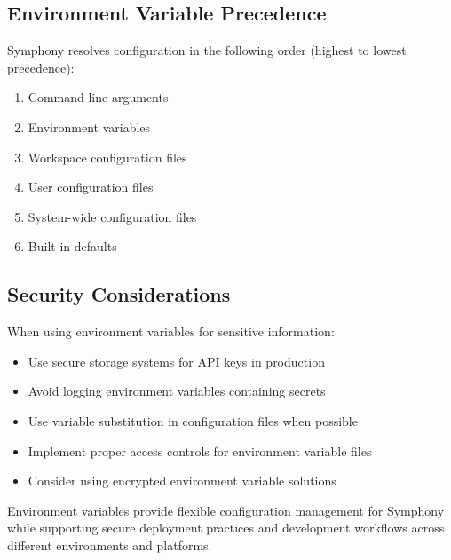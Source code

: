 \subsection*{Environment Variable Precedence}

Symphony resolves configuration in the following order (highest to lowest precedence):

\begin{enumerate}
\item Command-line arguments
\item Environment variables
\item Workspace configuration files
\item User configuration files
\item System-wide configuration files
\item Built-in defaults
\end{enumerate}

\subsection*{Security Considerations}

When using environment variables for sensitive information:

\begin{itemize}
\item Use secure storage systems for API keys in production
\item Avoid logging environment variables containing secrets
\item Use variable substitution in configuration files when possible
\item Implement proper access controls for environment variable files
\item Consider using encrypted environment variable solutions
\end{itemize}

Environment variables provide flexible configuration management for Symphony while supporting secure deployment practices and development workflows across different environments and platforms.
